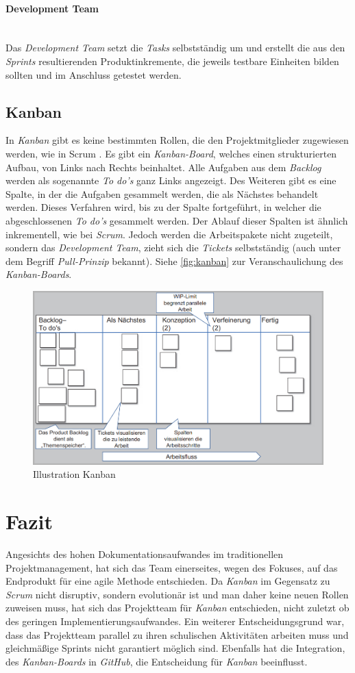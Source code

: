 \paragraph{Development Team}~\\
Das \textit{Development Team} setzt die \textit{Tasks} selbstständig um und erstellt die aus den \textit{Sprints} resultierenden Produktinkremente, die jeweils testbare Einheiten bilden sollten und im Anschluss getestet werden.

\subsection{Kanban}
In \textit{Kanban} gibt es keine bestimmten Rollen, die den Projektmitglieder zugewiesen werden, wie in Scrum \cite{pm-agil-ursula}. Es gibt ein \textit{Kanban-Board}, welches einen strukturierten Aufbau, von Links nach Rechts beinhaltet. Alle Aufgaben aus dem \textit{Backlog} werden als sogenannte \textit{To do's} ganz Links angezeigt. Des Weiteren gibt es eine Spalte, in der die Aufgaben gesammelt werden, die als Nächstes behandelt werden. Dieses Verfahren wird, bis zu der Spalte fortgeführt, in welcher die abgeschlossenen \textit{To do's} gesammelt werden. Der Ablauf dieser Spalten ist ähnlich inkrementell, wie bei \textit{Scrum}. Jedoch werden die Arbeitspakete nicht zugeteilt, sondern das \textit{Development Team}, zieht sich die \textit{Tickets} selbstständig (auch unter dem Begriff \textit{Pull-Prinzip} bekannt). Siehe \autoref{fig:kanban} zur Veranschaulichung des \textit{Kanban-Boards}. 
\begin{figure}[H]
	\centering
	\includegraphics[width=0.6\linewidth]{images/projektmanagement/kanban}
	\caption[Kanban]{Illustration Kanban \cite{pm-agil-ursula}}
	\label{fig:kanban}
\end{figure}
\section{Fazit}
Angesichts des hohen Dokumentationsaufwandes im traditionellen Projektmanagement, hat sich das Team einerseites, wegen des Fokuses, auf das Endprodukt für eine agile Methode entschieden. Da \textit{Kanban} im Gegensatz zu \textit{Scrum} nicht disruptiv, sondern evolutionär ist und man daher keine neuen Rollen zuweisen muss, hat sich das Projektteam für \textit{Kanban} entschieden, nicht zuletzt ob des geringen Implementierungsaufwandes. Ein weiterer Entscheidungsgrund war, dass das Projektteam parallel zu ihren schulischen Aktivitäten arbeiten muss und gleichmäßige Sprints nicht garantiert möglich sind. Ebenfalls hat die Integration, des \textit{Kanban-Boards} in \textit{GitHub}, die Entscheidung für \textit{Kanban} beeinflusst.